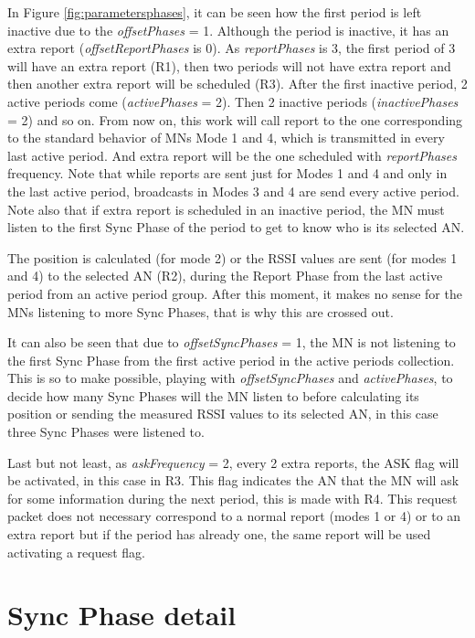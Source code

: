 In Figure \ref{fig:parametersphases}, it can be seen how the first period is left inactive due to the \textit{offsetPhases} = 1. Although the period
is inactive, it has an extra report (\textit{offsetReportPhases} is 0). As \textit{reportPhases} is 3, the first period of 3 will have an extra report (R1), 
then two periods will not have extra report and then another extra report will be scheduled (R3). After the first inactive period, 2 active 
periods come (\textit{activePhases} = 2). Then 2 inactive periods (\textit{inactivePhases} = 2) and so on. From now on, this work will call report to the one 
corresponding to the standard behavior of \acp{MN} Mode 1 and 4, which is transmitted in every last active period. And extra report will be 
the one scheduled with \textit{reportPhases} frequency. Note that while reports are sent just for Modes 1 and 4 and only in the last active period,
broadcasts in Modes 3 and 4 are send every active period. Note also that if extra report is scheduled in an inactive period, the \ac{MN} must
listen to the first Sync Phase of the period to get to know who is its selected \ac{AN}.

The position is calculated (for mode 2) or the \ac{RSSI} values are sent (for modes 1 and 4) to the selected \ac{AN} (R2), during the Report Phase from 
the last active period from an active period group. After this moment, it makes no sense for the \acp{MN} listening to more
Sync Phases, that is why this are crossed out. 

It can also be seen that due to \textit{offsetSyncPhases} = 1, the \ac{MN} is not listening to the first Sync Phase from the first active period in the active
periods collection. This is so to make possible, playing with \textit{offsetSyncPhases} and \textit{activePhases}, to decide how many Sync Phases will the \ac{MN}
listen to before calculating its position or sending the measured \ac{RSSI} values to its selected \ac{AN}, in this case three Sync Phases were listened to.

Last but not least, as \textit{askFrequency} = 2, every 2 extra reports, the ASK flag will be activated, in this case in R3. This flag indicates the 
\ac{AN} that the \ac{MN} will ask for some information during the next period, this is made with R4. This request packet does not necessary correspond
to a normal report (modes 1 or 4) or to an extra report but if the period has already one, the same report will be used activating a request
flag.


\section{Sync Phase detail}


